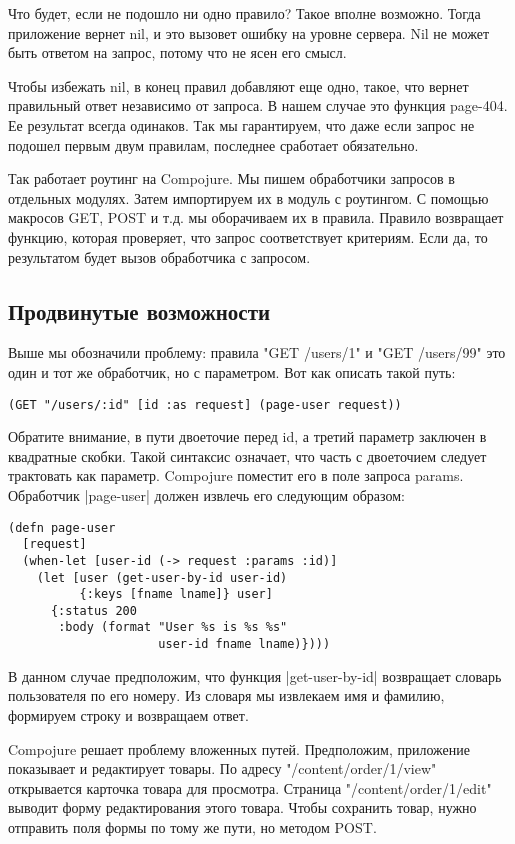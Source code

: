Что будет, если не подошло ни одно правило? Такое вполне возможно. Тогда
приложение вернет nil, и это вызовет ошибку на уровне сервера. Nil не может быть
ответом на запрос, потому что не ясен его смысл.

Чтобы избежать nil, в конец правил добавляют еще одно, такое, что вернет
правильный ответ независимо от запроса. В нашем случае это функция page-404. Ее
результат всегда одинаков. Так мы гарантируем, что даже если запрос не подошел
первым двум правилам, последнее сработает обязательно.

Так работает роутинг на Compojure. Мы пишем обработчики запросов в отдельных
модулях. Затем импортируем их в модуль с роутингом. С помощью макросов GET, POST
и т.д. мы оборачиваем их в правила. Правило возвращает функцию, которая
проверяет, что запрос соответствует критериям. Если да, то результатом будет
вызов обработчика с запросом.

\subsection{Продвинутые возможности}

Выше мы обозначили проблему: правила "GET /users/1" и "GET /users/99" это один и
тот же обработчик, но с параметром. Вот как описать такой путь:

\begin{verbatim}
(GET "/users/:id" [id :as request] (page-user request))
\end{verbatim}

Обратите внимание, в пути двоеточие перед id, а третий параметр заключен в
квадратные скобки. Такой синтаксис означает, что часть с двоеточием следует
трактовать как параметр. Compojure поместит его в поле запроса
params. Обработчик \spverb|page-user| должен извлечь его следующим образом:

\begin{verbatim}
(defn page-user
  [request]
  (when-let [user-id (-> request :params :id)]
    (let [user (get-user-by-id user-id)
          {:keys [fname lname]} user]
      {:status 200
       :body (format "User %s is %s %s"
                     user-id fname lname)})))
\end{verbatim}

В данном случае предположим, что функция \spverb|get-user-by-id| возвращает словарь
пользователя по его номеру. Из словаря мы извлекаем имя и фамилию, формируем
строку и возвращаем ответ.

Compojure решает проблему вложенных путей. Предположим, приложение показывает и
редактирует товары. По адресу "/content/order/1/view" открывается карточка
товара для просмотра. Страница "/content/order/1/edit" выводит форму
редактирования этого товара. Чтобы сохранить товар, нужно отправить поля формы
по тому же пути, но методом POST.

